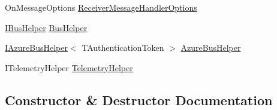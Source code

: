 \begin{DoxyCompactItemize}
\item 
On\+Message\+Options \hyperlink{classCqrs_1_1Azure_1_1ServiceBus_1_1AzureServiceBus_abe75d8be8b9ffbc5a37164467963babd}{Receiver\+Message\+Handler\+Options}
\item 
\hyperlink{interfaceCqrs_1_1Bus_1_1IBusHelper}{I\+Bus\+Helper} \hyperlink{classCqrs_1_1Azure_1_1ServiceBus_1_1AzureServiceBus_aba45a2bece8e265b9f06695b1e90a2a1}{Bus\+Helper}
\item 
\hyperlink{interfaceCqrs_1_1Azure_1_1ServiceBus_1_1IAzureBusHelper}{I\+Azure\+Bus\+Helper}$<$ T\+Authentication\+Token $>$ \hyperlink{classCqrs_1_1Azure_1_1ServiceBus_1_1AzureServiceBus_a7c537c53265bf01d550982c04579493e}{Azure\+Bus\+Helper}
\item 
I\+Telemetry\+Helper \hyperlink{classCqrs_1_1Azure_1_1ServiceBus_1_1AzureServiceBus_af5f6d62cbdb3ad711ea42505491ffca3}{Telemetry\+Helper}
\end{DoxyCompactItemize}


\subsection{Constructor \& Destructor Documentation}
\mbox{\label{classCqrs_1_1Azure_1_1ServiceBus_1_1AzureServiceBus_a44845c00c29574c2fa2d43a8a6b124ca}} 
